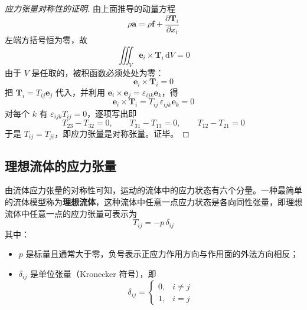 \begin{proof}[应力张量对称性的证明]
	由上面推导的动量方程
	\begin{equation}
		\rho\boldsymbol{a}=\rho\boldsymbol{f}+\frac{\partial\boldsymbol{T}_i}{\partial x_i}
	\end{equation}
	左端方括号恒为零，故
	\begin{equation}
		\iiint_V\boldsymbol{e}_i\times\boldsymbol{T}_i\,\mathrm{d}V=0
	\end{equation}
	由于 $V$ 是任取的，被积函数必须处处为零：
	\begin{equation}
		\boldsymbol{e}_i\times\boldsymbol{T}_i=0
	\end{equation}
	把 $\boldsymbol{T}_i=T_{ij}\boldsymbol{e}_j$ 代入，并利用 $\boldsymbol{e}_i\times\boldsymbol{e}_j=\varepsilon_{ijk}\boldsymbol{e}_k$，得
	\begin{equation}
		\boldsymbol{e}_i\times\boldsymbol{T}_i=T_{ij}\,\varepsilon_{ijk}\boldsymbol{e}_k=0
	\end{equation}
	对每个 $k$ 有 $\varepsilon_{ijk}T_{ij}=0$，逐项写出即
	\begin{equation}\label{eq:symmetry-components}
		T_{23}-T_{32}=0,\qquad T_{31}-T_{13}=0,\qquad T_{12}-T_{21}=0
	\end{equation}
	于是 $T_{ij}=T_{ji}$，即应力张量是对称张量。证毕。
\end{proof}

\subsection{理想流体的应力张量}

\begin{theorem}[理想流体的应力张量]
	由流体应力张量的对称性可知，运动的流体中的应力状态有六个分量。一种最简单的流体模型称为\textbf{理想流体}，这种流体中任意一点应力状态是各向同性张量，即理想流体中任意一点的应力张量可表示为
	\begin{equation}\label{eq:ideal-fluid-stress}
		T_{ij}=-p\,\delta_{ij}
	\end{equation}
	其中：
	\begin{itemize}
		\item $p$ 是标量且通常大于零，负号表示正应力作用方向与作用面的外法方向相反；
		\item $\delta_{ij}$ 是单位张量（Kronecker 符号），即
		      \begin{equation}\label{eq:kronecker-delta}
			      \delta_{ij}=\begin{cases}
				      0, & i\neq j\\
				      1, & i=j
			      \end{cases}
		      \end{equation}
	\end{itemize}
\end{theorem}

